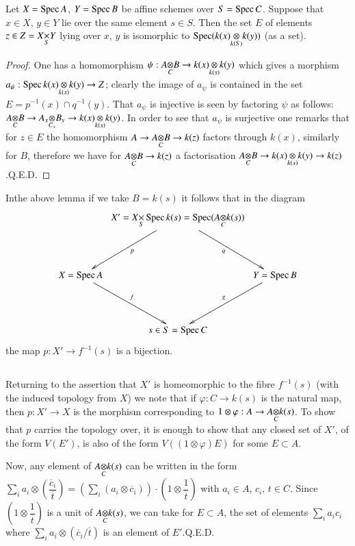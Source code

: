 \begin{lemma}\label{chap2-lem2.3.1}%
Let $X=\operatorname{Spec} A$, $Y=\operatorname{Spec} B$ be affine schemes over $S=\operatorname{Spec}
C$. Suppose that $x\in X$, $y\in Y$ lie over the same element $s\in
S$. Then the set $E$ of elements $z\in Z=\fprod{X}{Y}{S}$ lying over
$x$, $y$ is isomorphic to $\Spec (\foprod{k(x)}{k(y)}{k(S)})$ (as a
set). 
\end{lemma}

\begin{proof}
One has a homomorphism $\psi:\foprod{A}{B}{C}\to
\foprod{k(x)}{k(y)}{k(s)}$ which gives a morphism
$a_{\psi}:\foprod{\Spec k(x)}{k(y)}{k(s)}\to Z$; clearly the image of
$a_{\psi}$ is contained in the set $E=p^{-1}(x)\cap q^{-1}(y)$. That
$a_{\psi}$ is injective is seen by factoring $\psi$ as follows:
$\foprod{A}{B}{C}\to \foprod{A_{x}}{B_{y}}{C_{s}}\to
\foprod{k(x)}{k(y)}{k(s)}$. In order to see that $a_{\psi}$ is
surjective one remarks that for $z\in E$ the homomorphism $A\to
\foprod{A}{B}{C}\to k(z)$ factors through $k(x)$, similarly for $B$,
therefore we have for $\foprod{A}{B}{C}\to k(z)$ a factorisation
$\foprod{A}{B}{C}\to \foprod{k(x)}{k(y)}{k(s)}\to k(z)$.\hfill Q.E.D. 
\end{proof}

In\pageoriginale the above lemma if we take $B=k(s)$ it follows that
in the diagram
\[
\xymatrix@C=.1cm@R=1.5cm{
 & X'=\fprod{X}{\Spec
    k(s)}{S}=\Spec(\foprod{A}{k(s)}{C})\ar[dl]^{p}\ar[dr]_{q} &\\
X=\Spec A\ar[dr]^{f} & & Y=\Spec B\ar[dl]_{g}\\
& s\in S=\Spec C & 
}
\]
the map $p:X'\to f^{-1}(s)$ is a bijection.

\setcounter{subsection}{1}
\subsection{}\label{chap2-sec2.3.2}%

Returning to the assertion that $X'$ is homeomorphic to the fibre
$f^{-1}(s)$ (with the induced topology from $X$) we note that if
$\varphi:C\to k(s)$ is the natural map, then $p:X'\to X$ is the
morphism corresponding to $1\otimes \varphi:A\to
\foprod{A}{k(s)}{C}$. To show that $p$ carries the topology over, it
is enough to show that any closed set of $X'$, of the form $V(E')$, is
also of the form $V((1\otimes\varphi)E)$ for some $E\subset A$.

Now, any element of $\foprod{A}{k(s)}{C}$ can be written in the form
$\sum\limits_{i}a_{i}\otimes\left(\dfrac{\overline{c}_{i}}{\overline{t}}\right)=\left(\sum\limits_{i}(a_{i}\otimes\overline{c}_{i})\right)\cdot
\left(1\otimes\dfrac{1}{\overline{t}}\right)$ with $a_{i}\in A$,
$c_{i}$, $t\in C$. Since\pageoriginale
$\left(1\otimes\dfrac{1}{\overline{t}}\right)$ is a unit of
$\foprod{A}{k(s)}{C}$, we can take for $E\subset A$, the set of
elements $\sum\limits_{i}a_{i}c_{i}$ where
$\sum\limits_{i}a_{i}\otimes\left(\overline{c}_{i}/\overline{t}\right)$
is an element of $E'$.\hfill Q.E.D.

